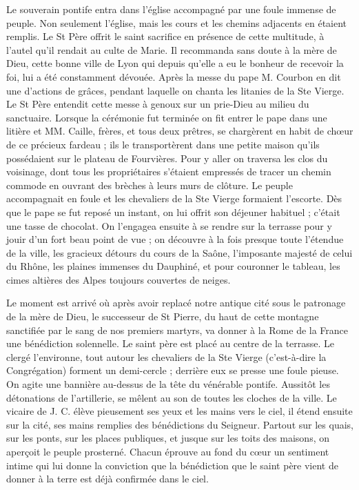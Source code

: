Le souverain pontife entra dans l'église accompagné par une foule immense de peuple. Non seulement l'église, mais les cours et les chemins adjacents en étaient remplis. Le St Père offrit le saint sacrifice en présence de cette multitude, à l'autel qu'il rendait au culte de Marie. Il recommanda sans doute à la mère de Dieu, cette bonne ville de Lyon qui depuis qu'elle a
eu le bonheur de recevoir la foi, lui a été constamment dévouée. Après la messe du pape M. Courbon en dit une d'actions de grâces, pendant laquelle on chanta les litanies de la Ste Vierge. Le St Père entendit cette messe à genoux sur un prie-Dieu au milieu du sanctuaire. Lorsque la cérémonie fut terminée on fit entrer le pape dans une litière et MM. Caille, frères, et tous deux prêtres, se chargèrent en habit de chœur de ce précieux fardeau ; ils le transportèrent dans une petite maison qu'ils possédaient sur le plateau de Fourvières. Pour y aller on traversa les clos du voisinage, dont tous les propriétaires s'étaient empressés de tracer un chemin commode en ouvrant des brèches à leurs murs de clôture. Le peuple accompagnait en foule et les chevaliers de la Ste Vierge formaient l'escorte. Dès que le pape se fut reposé un instant, on lui offrit son déjeuner habituel ; c'était une tasse de chocolat. On l'engagea ensuite à se rendre sur la terrasse pour y jouir d'un fort beau point de vue ; on découvre à la fois presque toute l'étendue de la ville, les gracieux détours du cours de la Saône, l'imposante majesté de celui du Rhône, les plaines immenses du Dauphiné, et pour couronner le tableau, les cimes altières des Alpes toujours couvertes de neiges.

Le moment est arrivé où après avoir replacé notre antique cité sous le patronage de la mère de Dieu, le successeur de St Pierre, du haut de cette montagne sanctifiée par le sang de nos premiers martyrs, va donner à la Rome de la France une bénédiction solennelle. Le saint père est placé au centre de la terrasse. Le clergé l'environne, tout autour les chevaliers de la Ste Vierge (c'est-à-dire la Congrégation) forment un demi-cercle ; derrière eux se presse une foule pieuse. On agite une bannière au-dessus
de la tête du vénérable pontife. Aussitôt les détonations de l'artillerie, se mêlent au son de toutes les cloches de la ville. Le vicaire de J. C. élève pieusement ses yeux et les mains vers le ciel, il étend ensuite sur la cité, ses mains remplies des bénédictions du Seigneur. Partout sur les quais, sur les ponts, sur les places publiques, et jusque sur les toits des maisons, on aperçoit le peuple prosterné. Chacun éprouve au fond du cœur un sentiment intime qui lui donne la conviction que la bénédiction que le saint père vient de donner à la terre est déjà confirmée dans le ciel.

